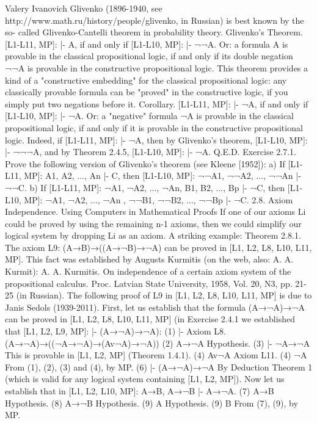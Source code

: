 Valery Ivanovich Glivenko (1896-1940, see http://www.math.ru/history/people/glivenko, in Russian) is best known by the so-
called Glivenko-Cantelli theorem in probability theory.
Glivenko's Theorem. [L1-L11, MP]: |- A, if and only if [L1-L10, MP]: |- ¬¬A. Or: a formula A is provable
in the classical propositional logic, if and only if its double negation ¬¬A is provable in the constructive
propositional logic.
This theorem provides a kind of a "constructive embedding" for the classical propositional logic: any
classically provable formula can be "proved" in the constructive logic, if you simply put two negations
before it.
Corollary. [L1-L11, MP]: |- ¬A, if and only if [L1-L10, MP]: |- ¬A. Or: a "negative" formula ¬A is
provable in the classical propositional logic, if and only if it is provable in the constructive propositional
logic.
Indeed, if [L1-L11, MP]: |- ¬A, then by Glivenko's theorem, [L1-L10, MP]: |- ¬¬¬A, and by Theorem
2.4.5, [L1-L10, MP]: |- ¬A. Q.E.D.
Exercise 2.7.1. Prove the following version of Glivenko's theorem (see Kleene [1952]):
a) If [L1-L11, MP]: A1, A2, ..., An |- C, then [L1-L10, MP]: ¬¬A1, ¬¬A2, ..., ¬¬An |- ¬¬C.
b) If [L1-L11, MP]: ¬A1, ¬A2, ..., ¬An, B1, B2, ..., Bp |- ¬C, then [L1-L10, MP]: ¬A1, ¬A2, ..., ¬An , ¬¬B1,
¬¬B2, ..., ¬¬Bp |- ¬C.
2.8. Axiom Independence. Using Computers in Mathematical Proofs
If one of our axioms Li could be proved by using the remaining n-1 axioms, then we could simplify our
logical system by dropping Li as an axiom. A striking example:
Theorem 2.8.1. The axiom L9: (A→B)→((A→¬B)→¬A) can be proved in [L1, L2, L8, L10, L11, MP].
This fact was established by Augusts Kurmitis (on the web, also: A. A. Kurmit):
A. A. Kurmitis. On independence of a certain axiom system of the propositional calculus. Proc. Latvian State University,
1958, Vol. 20, N3, pp. 21-25 (in Russian).
The following proof of L9 in [L1, L2, L8, L10, L11, MP] is due to Janis Sedols (1939-2011).
First, let us establish that the formula (A→¬A)→¬A can be proved in [L1, L2, L8, L10, L11, MP] (in
Exercise 2.4.1 we established that [L1, L2, L9, MP]: |- (A→¬A)→¬A):
(1)
|-
Axiom L8.
(A→¬A)→((¬A→¬A)→(Av¬A)→¬A))
(2) A→¬A Hypothesis.
(3) |- ¬A→¬A This is provable in [L1, L2, MP] (Theorem
                1.4.1).
(4) Av¬A Axiom L11.
(4) ¬A From (1), (2), (3) and (4), by MP.
(6) |- (A→¬A)→¬A By Deduction Theorem 1 (which is valid for
                      any logical system containing [L1, L2, MP]).
Now let us establish that in [L1, L2, L10, MP]: A→B, A→¬B |- A→¬A.
(7) A→B Hypothesis.
(8) A→¬B Hypothesis.
(9) A Hypothesis.
(9) B From (7), (9), by MP.
